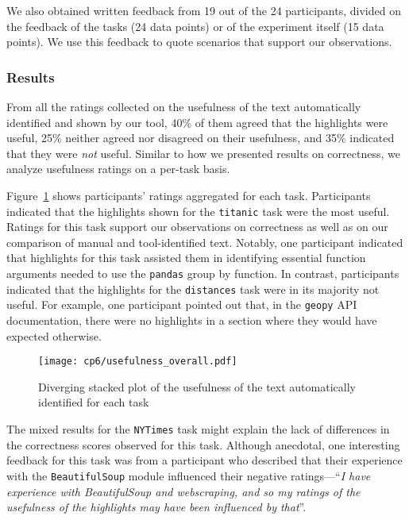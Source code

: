We also obtained written feedback from 19 out of the 24 participants, divided on the feedback of the tasks (24 data points)
or of the experiment itself (15 data points). We use this feedback to quote scenarios
that support our observations.



\subsubsection{Results}


From all the ratings collected on the  usefulness of the text automatically identified and shown by our tool, 40\% of them agreed that the highlights were useful, 
25\% neither agreed nor disagreed on their usefulness, and 35\% indicated that they were \textit{not} useful.
Similar to how we presented results on correctness, we analyze usefulness ratings on a per-task basis.  




Figure~\ref{fig:usefulness-by-task} shows participants' ratings aggregated for each task. 
Participants indicated that the highlights shown for the \texttt{titanic} task were the most useful. 
Ratings for this task support our observations on correctness as well as on our comparison of manual and tool-identified text. 
Notably, one participant indicated that highlights for this task assisted them in identifying essential function arguments needed to use the \texttt{pandas} group by function.
In contrast, participants indicated that the highlights for the \texttt{distances} task were in its majority not useful. 
For example, one participant pointed out that, in the \texttt{geopy} API documentation, there were no highlights in 
a section where they would have expected otherwise.


\begin{figure}
    \centering
    \texttt{[image: cp6/usefulness\_overall.pdf]}
    \caption{Diverging stacked plot of the usefulness of the text automatically identified for each task}
    \label{fig:usefulness-by-task}
\end{figure}


The mixed results for the \texttt{NYTimes} task might explain the lack of differences in the correctness scores observed for this task. 
Although anecdotal, one interesting feedback for this task was from a participant who described that 
their experience with the \texttt{BeautifulSoup} module influenced their negative ratings---``\textit{I have experience with BeautifulSoup and webscraping, and so my ratings of the usefulness of the highlights may have been influenced by that}''.








